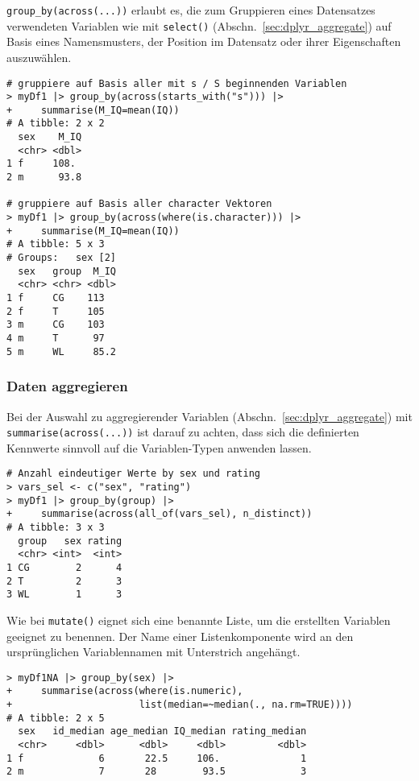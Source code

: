 \lstinline!group_by(across(...))! erlaubt es, die zum Gruppieren eines Datensatzes verwendeten Variablen wie mit \lstinline!select()! (Abschn.\ \ref{sec:dplyr_aggregate}) auf Basis eines Namensmusters, der Position im Datensatz oder ihrer Eigenschaften auszuwählen.
\begin{lstlisting}
# gruppiere auf Basis aller mit s / S beginnenden Variablen
> myDf1 |> group_by(across(starts_with("s"))) |>
+     summarise(M_IQ=mean(IQ))
# A tibble: 2 x 2
  sex    M_IQ
  <chr> <dbl>
1 f     108. 
2 m      93.8

# gruppiere auf Basis aller character Vektoren
> myDf1 |> group_by(across(where(is.character))) |>
+     summarise(M_IQ=mean(IQ))
# A tibble: 5 x 3
# Groups:   sex [2]
  sex   group  M_IQ
  <chr> <chr> <dbl>
1 f     CG    113  
2 f     T     105  
3 m     CG    103  
4 m     T      97  
5 m     WL     85.2
\end{lstlisting}

\subsubsection{Daten aggregieren}

Bei der Auswahl zu aggregierender Variablen (Abschn.\ \ref{sec:dplyr_aggregate}) mit \lstinline!summarise(across(...))! ist darauf zu achten, dass sich die definierten Kennwerte sinnvoll auf die Variablen-Typen anwenden lassen.
\begin{lstlisting}
# Anzahl eindeutiger Werte by sex und rating
> vars_sel <- c("sex", "rating")
> myDf1 |> group_by(group) |>
+     summarise(across(all_of(vars_sel), n_distinct))
# A tibble: 3 x 3
  group   sex rating
  <chr> <int>  <int>
1 CG        2      4
2 T         2      3
3 WL        1      3
\end{lstlisting}

Wie bei \lstinline!mutate()! eignet sich eine benannte Liste, um die erstellten Variablen geeignet zu benennen. Der Name einer Listenkomponente wird an den ursprünglichen Variablennamen mit Unterstrich angehängt.
\begin{lstlisting}
> myDf1NA |> group_by(sex) |>
+     summarise(across(where(is.numeric),
+                      list(median=~median(., na.rm=TRUE))))
# A tibble: 2 x 5
  sex   id_median age_median IQ_median rating_median
  <chr>     <dbl>      <dbl>     <dbl>         <dbl>
1 f             6       22.5     106.              1
2 m             7       28        93.5             3
\end{lstlisting}

